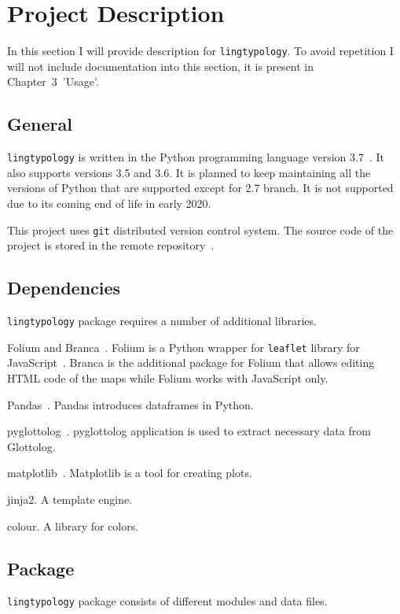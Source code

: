 \documentclass[a4paper,12pt]{article}
\begin{document}
\newpage


\section{Project Description}
In this section I will provide description for \texttt{lingtypology}. To avoid repetition I will not include documentation into this section, it is present in Chapter~3~'Usage'.

\subsection{General}
\texttt{lingtypology} is written in the Python programming language version 3.7~\parencite{python}. It also supports versions 3.5 and 3.6. It is planned to keep maintaining all the versions of Python that are supported except for 2.7 branch. It is not supported due to its coming end of life in early 2020.

This project uses \texttt{git} distributed version control system. The source code of the project is stored in the remote repository~\parencite{MichaelVoronov2019}.

\subsection{Dependencies}
\texttt{lingtypology} package requires a number of additional libraries.
\begin{itemize}
\begin{samepage}
  \item Folium and Branca~\parencite{folium}. Folium is a Python wrapper for \texttt{leaflet} library for JavaScript~\parencite{leaflet}. Branca is the additional package for Folium that allows editing HTML code of the maps while Folium works with JavaScript only. 
  \item Pandas~\parencite{pandas}. Pandas introduces dataframes in Python.
  \item pyglottolog~\parencite{Robert2Forkel2019}. pyglottolog application is used to extract necessary data from Glottolog.
  \item matplotlib~\parencite{matplotlib}. Matplotlib is a tool for creating plots.
  \item jinja2. A template engine.
  \item colour. A library for colors.
\end{samepage}
\end{itemize}

\subsection{Package}
\texttt{lingtypology} package consists of different modules and data files.
\end{document}
